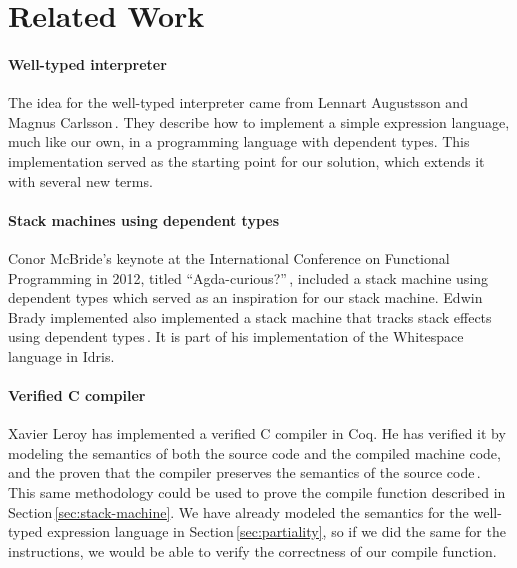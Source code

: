 \section{Related Work}
\label{sec:related-work}


\paragraph{Well-typed interpreter}
The idea for the well-typed interpreter came from Lennart Augustsson and Magnus Carlsson\,\cite{Augustsson99anexercise}. They describe how to implement a simple expression language, much like our own, in a programming language with dependent types. This implementation served as the starting point for our solution, which extends it with several new terms. 

\paragraph{Stack machines using dependent types}
Conor McBride's keynote at the International Conference on Functional Programming in 2012, titled ``Agda-curious?''\,\cite{McBride:2012:AEP:2364527.2364529}, included a stack machine using dependent types which served as an inspiration for our stack machine. Edwin Brady implemented also implemented a stack machine that tracks stack effects using dependent types\,\cite{Brady:WS-idr}. It is part of his implementation of the Whitespace language in Idris.

\paragraph{Verified C compiler}
Xavier Leroy has implemented a verified C compiler in Coq. He has verified it by modeling the semantics of both the source code and the compiled machine code, and the proven that the compiler preserves the semantics of the source code\,\cite{Leroy_formalverification}. This same methodology could be used to prove the compile function described in Section\,\ref{sec:stack-machine}. We have already modeled the semantics for the well-typed expression language in Section\,\ref{sec:partiality}, so if we did the same for the instructions, we would be able to verify the correctness of our compile function.
